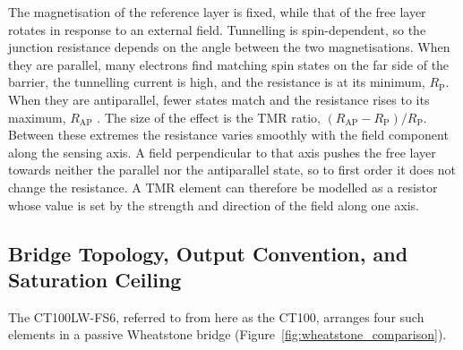 \documentclass[12pt,a4paper]{article}
\begin{document}
The magnetisation of the reference layer is fixed, while that of the free layer rotates in response to an external field. Tunnelling is spin-dependent, so the junction resistance depends on the angle between the two magnetisations. When they are parallel, many electrons find matching spin states on the far side of the barrier, the tunnelling current is high, and the resistance is at its minimum, $R_{\text{P}}$. When they are antiparallel, fewer states match and the resistance rises to its maximum, $R_{\text{AP}}$ \cite{julliere1975}. The size of the effect is the TMR ratio, $(R_{\text{AP}} - R_{\text{P}})/R_{\text{P}}$. Between these extremes the resistance varies smoothly with the field component along the sensing axis. A field perpendicular to that axis pushes the free layer towards neither the parallel nor the antiparallel state, so to first order it does not change the resistance. A TMR element can therefore be modelled as a resistor whose value is set by the strength and direction of the field along one axis.

\subsection{Bridge Topology, Output Convention, and Saturation Ceiling}
\label{sec:bridge-topology}




The CT100LW-FS6, referred to from here as the CT100, arranges four such elements in a passive Wheatstone bridge (Figure~\ref{fig:wheatstone_comparison}).
\end{document}
